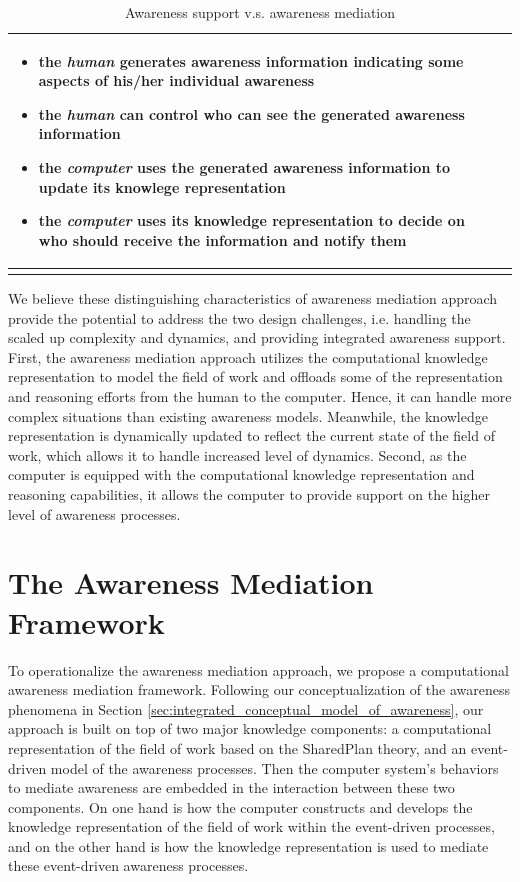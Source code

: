 {\begin{longtable}{>{\raggedright}p{1.1in}>{\raggedright}p{2.2in}>{\raggedright}p{2.2in}}
\begin{itemize}[nosep]
\item the \emph{human} generates awareness information indicating some aspects
of his/her individual awareness
\item the \emph{human} can control who can see the generated awareness information
\item the \emph{computer} uses the generated awareness information to update
its knowlege representation
\item the \emph{computer} uses its knowledge representation to decide on
who should receive the information and notify them\end{itemize}
\tabularnewline
\bottomrule
\caption{Awareness support v.s. awareness mediation}
\label{tab:awareness_support_vs_mediation}
\end{longtable}
}

We believe these distinguishing characteristics of awareness mediation approach provide the potential to address the two design challenges, i.e. handling the scaled up complexity and dynamics, and providing integrated awareness support. First, the awareness mediation approach utilizes the computational knowledge representation to model the field of work and offloads some of the representation and reasoning efforts from the human to the computer. Hence, it can  handle more complex situations than existing awareness models. Meanwhile, the knowledge representation is dynamically updated to reflect the current state of the field of work, which allows it to handle increased level of dynamics. Second, as the computer is equipped with the computational knowledge representation and reasoning capabilities, it allows the computer to provide support on the higher level of awareness processes.

\section{The Awareness Mediation Framework} %
\label{sec:awareness_mediation_framework}
To operationalize the awareness mediation approach, we propose a computational awareness mediation framework. Following our conceptualization of the awareness phenomena in Section \ref{sec:integrated_conceptual_model_of_awareness}, our approach is built on top of two major knowledge components: a computational representation of the field of work based on the SharedPlan theory, and an event-driven model of the awareness processes. Then the computer system's behaviors to mediate awareness are embedded in the interaction between these two components. On one hand is how the computer constructs and develops the knowledge representation of the field of work within the event-driven processes, and on the other hand is how the knowledge representation is used to mediate these event-driven awareness processes.

